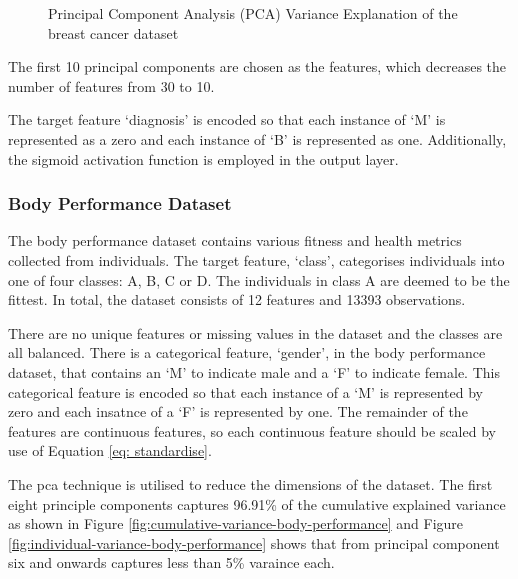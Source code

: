 \documentclass[10pt, conference]{IEEEtran}
\begin{document}
\begin{figure}[H]
    \centering
    \hfil
    \caption{Principal Component Analysis (PCA) Variance Explanation of the breast cancer dataset}
    \label{fig:pca-variance}
\end{figure}
The first 10 principal components are chosen as the features, which decreases the number of features from 30 to
10.

The target feature `diagnosis' is encoded so that each instance of `M' is represented as a zero and each instance
of `B' is represented as one. Additionally, the sigmoid activation function is employed in the output layer.

\subsubsection{Body Performance Dataset}

The body performance dataset contains various fitness and health metrics collected from individuals.
The target feature, `class', categorises individuals into one of four classes: A, B, C or D. The individuals
in class A are deemed to be the fittest. In total, the dataset consists of 12 features and 13393 observations.

There are no unique features or missing values in the dataset and the classes are all balanced.
There is a categorical feature, `gender', in the body performance dataset, that contains an `M' to indicate
male and a `F' to indicate female. This categorical feature is encoded so that each instance of a `M'
is represented by zero and each insatnce of a `F' is represented by one. The remainder of the features
are continuous features, so each continuous feature should be scaled by use of Equation \ref{eq: standardise}.

The \acrshort{pca} technique is utilised to reduce the dimensions of the dataset. The first eight principle
components captures 96.91\% of the cumulative explained variance as shown in Figure
\ref{fig:cumulative-variance-body-performance} and Figure \ref{fig:individual-variance-body-performance}
shows that from principal component six and onwards captures less than 5\% varaince each.
\end{document}
